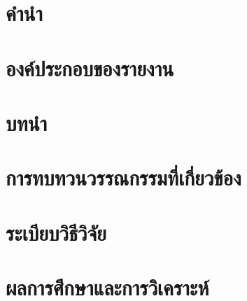\documentclass[a4paper]{article}
\begin{document}
\setcounter{page}{1}

\section*{คำนำ}

\newpage

\section*{องค์ประกอบของรายงาน}

\newpage

\section{บทนำ} 

\section{การทบทวนวรรณกรรมที่เกี่ยวข้อง} 

\section{ระเบียบวิธีวิจัย}

\section{ผลการศึกษาและการวิเคราะห์}
\end{document}
